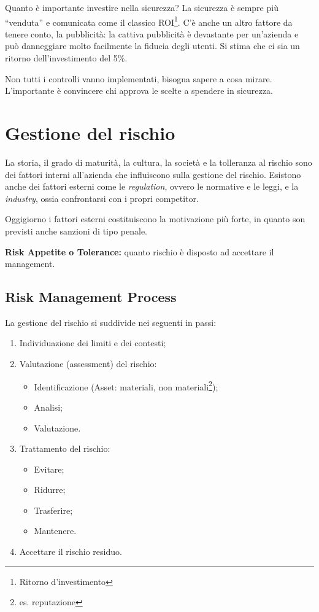 \label{riskMng}

Quanto è importante investire nella sicurezza? La sicurezza è sempre più
``venduta'' e comunicata come il classico ROI\footnote{Ritorno d'investimento}.
C'è anche un altro fattore da tenere conto, la pubblicità: la cattiva
pubblicità è devastante per un'azienda e può danneggiare molto
facilmente la fiducia degli utenti. Si stima che ci sia un ritorno
dell'investimento del 5\%.

Non tutti i controlli vanno implementati, bisogna sapere a cosa mirare.
L'importante è convincere chi approva le scelte a spendere in sicurezza.



\chapter{Gestione del rischio}

La storia, il grado di maturità, la cultura, la società e la tolleranza
al rischio sono dei fattori interni all'azienda che influiscono sulla
gestione del rischio.
Esistono anche dei fattori esterni come le
\textit{regulation}, ovvero le normative e le leggi, e la 
\textit{industry}, ossia confrontarsi con i propri competitor.

Oggigiorno i fattori esterni costituiscono la
motivazione più forte, in quanto son previsti anche sanzioni di tipo
penale.

\textbf{Risk Appetite o Tolerance:} quanto rischio è disposto ad accettare
il management.

\section{Risk Management Process}
La gestione del rischio si suddivide nei seguenti in passi:
\begin{enumerate}
\item Individuazione dei limiti e dei contesti;
\item Valutazione (assessment) del rischio:
\begin{itemize}
  \item Identificazione (Asset: materiali, non
  materiali\footnote{es. reputazione});
  \item Analisi;
  \item Valutazione.
\end{itemize}
\item Trattamento del rischio:
\begin{itemize}
  \item Evitare;
  \item Ridurre;
  \item Trasferire;
  \item Mantenere.
\end{itemize}
\item Accettare il rischio residuo.
\end{enumerate}

